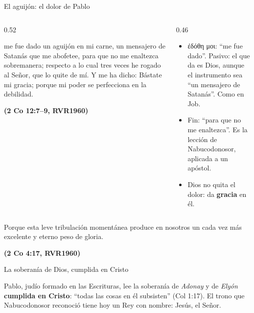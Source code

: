\documentclass[hyperref={bookmarks=false},aspectratio=169]{beamer}
\newcommand{\grc}[1]{\foreignlanguage{ancientgreek}{#1}}
\newcommand{\fuente}[1]{\par\hfill{\upshape\bfseries\footnotesize\textcolor{azul}{#1}}}
\newcommand{\destacar}[1]{\textbf{\textcolor{azul}{#1}}}
\begin{document}
\begin{frame}{El aguijón: el dolor de Pablo}
\begin{columns}[t,onlytextwidth]
\begin{column}{0.52\textwidth}
\begin{cita}me fue dado un aguijón en mi carne, un mensajero de Satanás que me abofetee, para que no me enaltezca sobremanera; respecto a lo cual tres veces he rogado al Señor, que lo quite de mí. Y me ha dicho: Bástate mi gracia; porque mi poder se perfecciona en la debilidad.\fuente{(2 Co 12:7--9, RVR1960)}\end{cita}
\end{column}
\begin{column}{0.46\textwidth}\small
\begin{itemize}
\item \grc{ἐδόθη μοι}: ``me fue dado''. Pasivo: el que da es Dios, aunque el instrumento sea ``un mensajero de Satanás''. Como en Job.
\item Fin: ``para que no me enaltezca''. Es la lección de Nabucodonosor, aplicada a un apóstol.
\item Dios no quita el dolor: da \destacar{gracia} en él.
\end{itemize}
\end{column}
\end{columns}\par\smallskip
\begin{cita}Porque esta leve tribulación momentánea produce en nosotros un cada vez más excelente y eterno peso de gloria.\fuente{(2 Co 4:17, RVR1960)}\end{cita}
\end{frame}

\begin{frame}{La soberanía de Dios, cumplida en Cristo}
\centering
{}\par\medskip
\small\RaggedRight Pablo, judío formado en las Escrituras, lee la soberanía de \emph{Adonay} y de \emph{Elyón} \destacar{cumplida en Cristo}: ``todas las cosas en él subsisten'' (Col 1:17). El trono que Nabucodonosor reconoció tiene hoy un Rey con nombre: Jesús, el Señor.
\end{frame}
\end{document}
